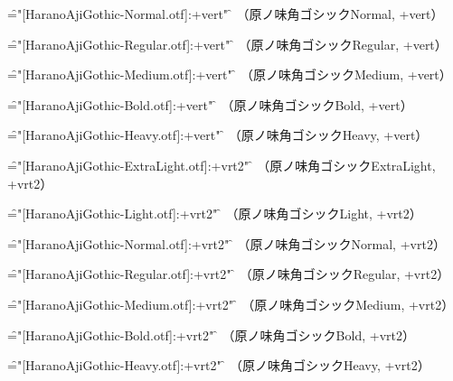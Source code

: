 \font\f="[HaranoAjiGothic-Normal.otf]:+vert" \f
\testAll
（原ノ味角ゴシックNormal, +vert）\par

\font\f="[HaranoAjiGothic-Regular.otf]:+vert" \f
\testAll
（原ノ味角ゴシックRegular, +vert）\par

\font\f="[HaranoAjiGothic-Medium.otf]:+vert" \f
\testAll
（原ノ味角ゴシックMedium, +vert）\par

\font\f="[HaranoAjiGothic-Bold.otf]:+vert" \f
\testAll
（原ノ味角ゴシックBold, +vert）\par

\font\f="[HaranoAjiGothic-Heavy.otf]:+vert" \f
\testAll
（原ノ味角ゴシックHeavy, +vert）\par


\font\f="[HaranoAjiGothic-ExtraLight.otf]:+vrt2" \f
\testAll
（原ノ味角ゴシックExtraLight, +vrt2）\par

\font\f="[HaranoAjiGothic-Light.otf]:+vrt2" \f
\testAll
（原ノ味角ゴシックLight, +vrt2）\par

\font\f="[HaranoAjiGothic-Normal.otf]:+vrt2" \f
\testAll
（原ノ味角ゴシックNormal, +vrt2）\par

\font\f="[HaranoAjiGothic-Regular.otf]:+vrt2" \f
\testAll
（原ノ味角ゴシックRegular, +vrt2）\par

\font\f="[HaranoAjiGothic-Medium.otf]:+vrt2" \f
\testAll
（原ノ味角ゴシックMedium, +vrt2）\par

\font\f="[HaranoAjiGothic-Bold.otf]:+vrt2" \f
\testAll
（原ノ味角ゴシックBold, +vrt2）\par

\font\f="[HaranoAjiGothic-Heavy.otf]:+vrt2" \f
\testAll
（原ノ味角ゴシックHeavy, +vrt2）\par

\bye
